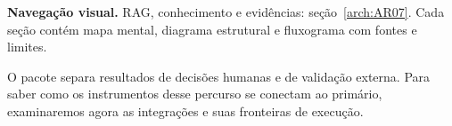 \begin{descricao}\textbf{Navegação visual.} RAG, conhecimento e evidências: seção~\ref{arch:AR07}. Cada seção contém mapa mental, diagrama estrutural e fluxograma com fontes e limites.\end{descricao}


O pacote separa resultados de decisões humanas e de validação externa. Para saber como os instrumentos desse percurso se conectam ao primário, examinaremos agora as integrações e suas fronteiras de execução.
